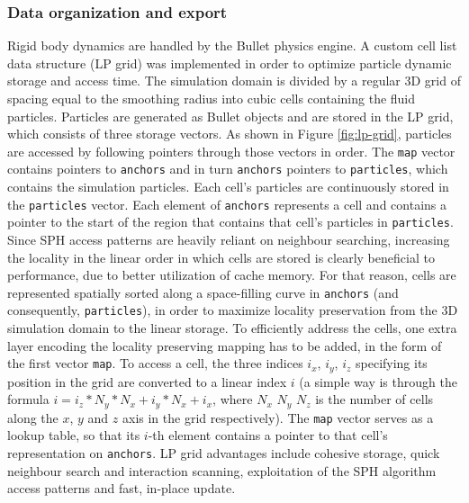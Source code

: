 \documentclass{llncs}
\begin{document}
\subsubsection{Data organization and export} Rigid body dynamics are handled by the Bullet
physics engine. A custom cell list data structure (LP grid) was implemented in order to
optimize particle dynamic storage and access time. The simulation domain is divided by a
regular 3D grid of spacing equal to the smoothing radius into cubic cells containing the
fluid particles. Particles are generated as Bullet objects and are stored in the LP grid,
which consists of three storage vectors. As shown in Figure \ref{fig:lp-grid}, particles
are accessed by following pointers through those vectors in order. The \texttt{map} vector
contains pointers to \texttt{anchors} and in turn \texttt{anchors} pointers to
\texttt{particles}, which contains the simulation particles. Each cell's particles are
continuously stored in the \texttt{particles} vector. Each element of \texttt{anchors}
represents a cell and contains a pointer to the start of the region that contains that
cell's particles in \texttt{particles}. Since SPH access patterns are heavily reliant on
neighbour searching, increasing the locality in the linear order in which cells are stored
is clearly beneficial to performance, due to better utilization of cache memory. For that
reason, cells are represented spatially sorted along a space-filling curve in
\texttt{anchors} (and consequently, \texttt{particles}), in order to maximize locality
preservation from the 3D simulation domain to the linear storage. To efficiently address
the cells, one extra layer encoding the locality preserving mapping has to be added, in
the form of the first vector \texttt{map}. To access a cell, the three indices $i_x$,
$i_y$, $i_z$ specifying its position in the grid are converted to a linear index $i$ (a
simple way is through the formula $i = i_z * N_y * N_x + i_y * N_x + i_x$, where $N_x$
$N_y$ $N_z$ is the number of cells along the $x$, $y$ and $z$ axis in the grid
respectively). The \texttt{map} vector serves as a lookup table, so that its $i$-th
element contains a pointer to that cell's representation on \texttt{anchors}. LP grid
advantages include cohesive storage, quick neighbour search and interaction scanning,
exploitation of the SPH algorithm access patterns and fast, in-place update.
\end{document}
